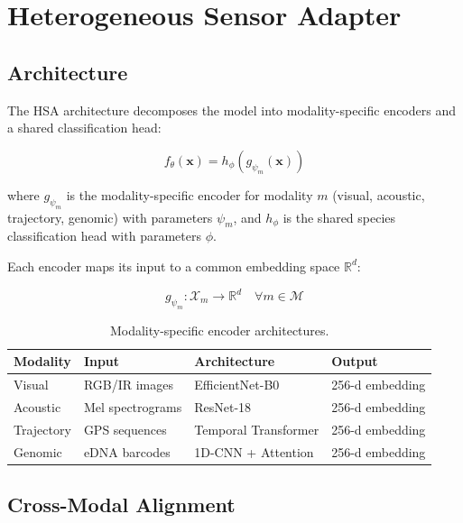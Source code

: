 \section{Heterogeneous Sensor Adapter}

\label{sec:hsa}

\subsection{Architecture}

The HSA architecture decomposes the model into modality-specific encoders and a shared classification head:

\begin{equation}
    f_\theta(\mathbf{x}) = h_\phi(g_{\psi_m}(\mathbf{x}))
\end{equation}

\noindent where $g_{\psi_m}$ is the modality-specific encoder for modality $m$ (visual, acoustic, trajectory, genomic) with parameters $\psi_m$, and $h_\phi$ is the shared species classification head with parameters $\phi$.

Each encoder maps its input to a common embedding space $\mathbb{R}^d$:

\begin{equation}
    g_{\psi_m}: \mathcal{X}_m \rightarrow \mathbb{R}^d \quad \forall m \in \mathcal{M}
\end{equation}

\begin{table}[H]
\centering
\caption{Modality-specific encoder architectures.}
\label{tab:encoders}
\begin{tabularx}{\textwidth}{@{}lllX@{}}
\toprule
\textbf{Modality} & \textbf{Input} & \textbf{Architecture} & \textbf{Output} \\
\midrule
Visual & RGB/IR images & EfficientNet-B0 & 256-d embedding \\
Acoustic & Mel spectrograms & ResNet-18 & 256-d embedding \\
Trajectory & GPS sequences & Temporal Transformer & 256-d embedding \\
Genomic & eDNA barcodes & 1D-CNN + Attention & 256-d embedding \\
\bottomrule
\end{tabularx}
\end{table}

\subsection{Cross-Modal Alignment}

